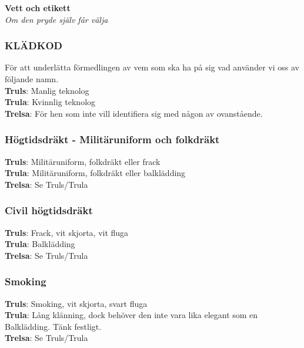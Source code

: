 \newpage

\tableofcontents

\newpage
\begin{center}
  \vspace*{1.5cm}
  {\fontsize{20}{20}\textbf{Vett och etikett}}\\
  \vspace{0.7cm}
  {\fontsize{12}{12}\textit{Om den pryde själv får välja}}
\end{center}
\noBackground
\newpage

\subsubsection*{KLÄDKOD}
För att underlätta förmedlingen av vem som ska ha på sig vad använder vi oss av följande namn.\\

\textbf{Truls}: Manlig teknolog\\
\textbf{Trula}: Kvinnlig teknolog\\
\textbf{Trelsa}: För hen som inte vill identifiera sig med någon av ovanstående.

\subsubsection*{Högtidsdräkt - Militäruniform och folkdräkt}

\textbf{Truls}: Militäruniform, folkdräkt eller frack\\
\textbf{Trula}: Militäruniform, folkdräkt eller balklädding\\
\textbf{Trelsa}: Se Truls/Trula

\subsubsection*{Civil högtidsdräkt}

\textbf{Truls}: Frack, vit skjorta, vit fluga\\
\textbf{Trula}: Balklädding\\
\textbf{Trelsa}: Se Truls/Trula

\subsubsection*{Smoking}
\textbf{Truls}: Smoking, vit skjorta, svart fluga\\
\textbf{Trula}: Lång klänning, dock behöver den inte vara lika elegant som en Balklädding. Tänk festligt.\\
\textbf{Trelsa}: Se Truls/Trula

